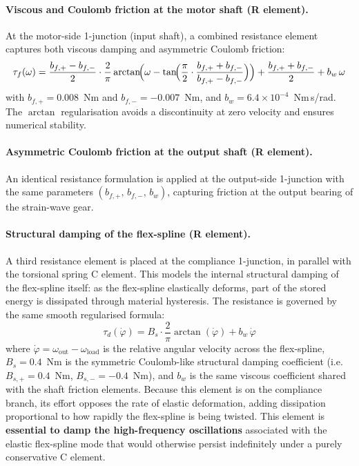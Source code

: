 \paragraph{Viscous and Coulomb friction at the motor shaft (R element).}
At the motor-side 1-junction (input shaft), a combined resistance element captures both viscous damping and asymmetric Coulomb friction:
\begin{equation}
  \tau_f(\omega) = \frac{b_{f,+} - b_{f,-}}{2} \cdot \frac{2}{\pi}\arctan\!\Bigl(\omega - \tan\!\Bigl(\frac{\pi}{2}\cdot\frac{b_{f,+}+b_{f,-}}{b_{f,+}-b_{f,-}}\Bigr)\Bigr)
  + \frac{b_{f,+}+b_{f,-}}{2}
  + b_w\,\omega
\end{equation}
with $b_{f,+} = 0.008$~Nm and $b_{f,-} = -0.007$~Nm, and $b_w = 6.4\times10^{-4}$~Nm\,s/rad.
The $\arctan$ regularisation avoids a discontinuity at zero velocity and ensures numerical stability.

\paragraph{Asymmetric Coulomb friction at the output shaft (R element).}
An identical resistance formulation is applied at the output-side 1-junction with the same parameters $(b_{f,+},\, b_{f,-},\, b_w)$, capturing friction at the output bearing of the strain-wave gear.

\paragraph{Structural damping of the flex-spline (R element).}
A third resistance element is placed at the compliance 1-junction, in parallel with the torsional spring C element.
This models the internal structural damping of the flex-spline itself: as the flex-spline elastically deforms, part of the stored energy is dissipated through material hysteresis.
The resistance is governed by the same smooth regularised formula:
\begin{equation}
  \tau_{d}(\dot{\varphi}) = B_s \cdot \frac{2}{\pi}\arctan(\dot{\varphi}) + b_w\,\dot{\varphi}
\end{equation}
where $\dot{\varphi} = \omega_{\text{out}} - \omega_{\text{load}}$ is the relative angular velocity across the flex-spline,
$B_s = 0.4$~Nm is the symmetric Coulomb-like structural damping coefficient (i.e.\ $B_{s,+} = 0.4$~Nm, $B_{s,-} = -0.4$~Nm), and $b_w$ is the same viscous coefficient shared with the shaft friction elements.
Because this element is on the compliance branch, its effort opposes the rate of elastic deformation, adding dissipation proportional to how rapidly the flex-spline is being twisted.
This element is \textbf{essential to damp the high-frequency oscillations} associated with the elastic flex-spline mode that would otherwise persist indefinitely under a purely conservative C element.

